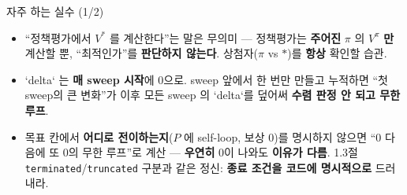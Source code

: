 \begin{frame}{자주 하는 실수 (1/2)}
  \begin{itemize}
    \item {} ``정책평가에서
      $V^{*}$ 를 계산한다''는 말은 무의미 --- 정책평가는
      \textbf{주어진} $\pi$ 의 $V^\pi$ \textbf{만} 계산할 뿐,
      ``최적인가''를 \textbf{판단하지 않는다}. 상첨자($\pi$ vs
      $*$)를 \textbf{항상} 확인할 습관.
    \item {} `delta`
      는 \textbf{매 sweep 시작}에 0으로. sweep 앞에서 한 번만
      만들고 누적하면 ``첫 sweep의 큰 변화''가 이후 모든 sweep
      의 `delta`를 덮어써 \textbf{수렴 판정 안 되고 무한 루프}.
    \item {} 목표 칸에서
      \textbf{어디로 전이하는지}($P$ 에 self-loop, 보상 0)를
      명시하지 않으면 ``0 다음에 또 0의 무한 루프''로 계산 ---
      \textbf{우연히} 0이 나와도 \textbf{이유가 다름}. 1.3절
      \texttt{terminated}/\texttt{truncated} 구분과 같은 정신:
      \textbf{종료 조건을 코드에 명시적으로} 드러내라.
  \end{itemize}
\end{frame}
